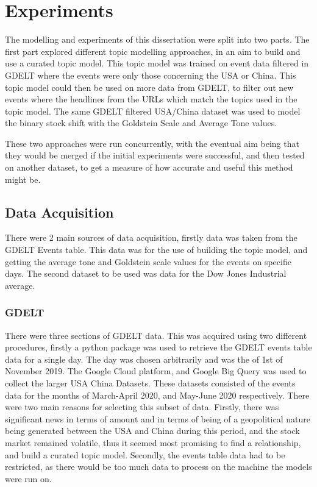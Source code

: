 \section{Experiments}
\label{experiments}
The modelling and experiments of this dissertation were split into two parts. The first part explored different topic modelling approaches, in an aim to build and use a curated topic model. This topic model was trained on event data filtered in GDELT where the events were only those concerning the USA or China. This topic model could then be used on more data from GDELT, to filter out new events where the headlines from the URLs which match the topics used in the topic model. The same GDELT filtered USA/China dataset was used to model the binary stock shift with the Goldstein Scale and Average Tone values. 

These two approaches were run concurrently, with the eventual aim being that they would be merged if the initial experiments were successful, and then tested on another dataset, to get a measure of how accurate and useful this method might be. 

\subsection{Data Acquisition}
There were 2 main sources of data acquisition, firstly data was taken from the GDELT Events table. This data was for the use of building the topic model, and getting the average tone and Goldstein scale values for the events on specific days. The second dataset to be used was data for the Dow Jones Industrial average.
\subsubsection{GDELT}
There were three sections of GDELT data. This was acquired using two different procedures, firstly a python package was used to retrieve the GDELT events table data for a single day. The day was chosen arbitrarily and was the of 1st of November 2019. The Google Cloud platform, and Google Big Query was used to collect the larger USA China Datasets. These datasets consisted of the events data for the months of March-April 2020, and May-June 2020 respectively. There were two main reasons for selecting this subset of data. Firstly, there was significant news in terms of amount and in terms of being of a geopolitical nature being generated between the USA and China during this period, and the stock market remained volatile, thus it seemed most promising to find a relationship, and build a curated topic model. Secondly, the events table data had to be restricted, as there would be too much data to process on the machine the models were run on. 

